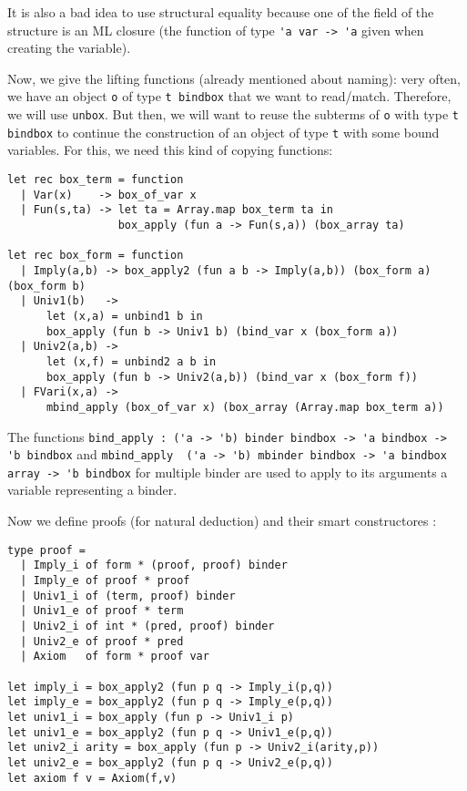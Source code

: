 \documentclass[11pt]{article}
\begin{document}
It is also a bad idea to use structural equality because
one of the field of the structure is an ML
closure (the function of type \verb#'a var -> 'a# given when
creating the variable).

Now, we give the lifting functions (already mentioned about naming): very often, we have
an object \verb#o# of type \verb#t bindbox# that we want to
read/match. Therefore, we will use \verb#unbox#.
But then, we will want to reuse the subterms of \verb#o# with
type  \verb#t bindbox# to continue the construction of an object of
type \verb#t# with some bound variables. For this, we need this kind
of copying functions:

\begin{verbatim}
let rec box_term = function
  | Var(x)    -> box_of_var x
  | Fun(s,ta) -> let ta = Array.map box_term ta in
                 box_apply (fun a -> Fun(s,a)) (box_array ta)

let rec box_form = function
  | Imply(a,b) -> box_apply2 (fun a b -> Imply(a,b)) (box_form a) (box_form b)
  | Univ1(b)   ->
      let (x,a) = unbind1 b in
      box_apply (fun b -> Univ1 b) (bind_var x (box_form a))
  | Univ2(a,b) ->
      let (x,f) = unbind2 a b in
      box_apply (fun b -> Univ2(a,b)) (bind_var x (box_form f))
  | FVari(x,a) ->
      mbind_apply (box_of_var x) (box_array (Array.map box_term a))
\end{verbatim}

The functions
\verb#bind_apply : ('a -> 'b) binder bindbox -> 'a bindbox -> 'b bindbox# and
\verb#mbind_apply  ('a -> 'b) mbinder bindbox -> 'a bindbox array -> 'b bindbox#
for multiple binder are
used to apply to its arguments a variable representing a binder.

Now we define proofs (for natural deduction) and their smart
constructores :
\begin{verbatim}
type proof =
  | Imply_i of form * (proof, proof) binder
  | Imply_e of proof * proof
  | Univ1_i of (term, proof) binder
  | Univ1_e of proof * term
  | Univ2_i of int * (pred, proof) binder
  | Univ2_e of proof * pred
  | Axiom   of form * proof var

let imply_i = box_apply2 (fun p q -> Imply_i(p,q))
let imply_e = box_apply2 (fun p q -> Imply_e(p,q))
let univ1_i = box_apply (fun p -> Univ1_i p)
let univ1_e = box_apply2 (fun p q -> Univ1_e(p,q))
let univ2_i arity = box_apply (fun p -> Univ2_i(arity,p))
let univ2_e = box_apply2 (fun p q -> Univ2_e(p,q))
let axiom f v = Axiom(f,v)
\end{verbatim}
\end{document}
